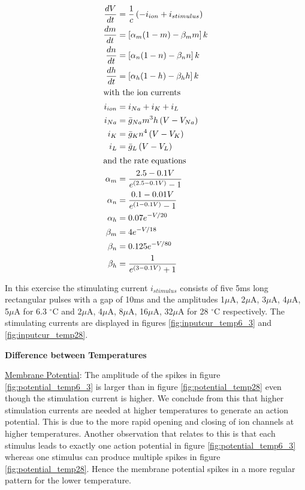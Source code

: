 \documentclass{scrartcl}
\begin{document}
\begin{align}
\frac{d V}{d t}&=\frac{1}{c}\left(-i_{i o n}+i_{s t i m u l u s}\right) \label{eq:membrane} \\
\frac{d m}{d t}&=\left[\alpha_{m}(1-m)-\beta_{m} m\right] k \label{eq:m}\\
\frac{d n}{d t}&=\left[\alpha_{n}(1-n)-\beta_{n} n\right] k \label{eq:n}\\
\frac{d h}{d t}&=\left[\alpha_{h}(1-h)-\beta_{h} h\right] k \label{eq:h}\\
\intertext{with the ion currents}
i_{i o n}&=i_{N a}+i_{K}+i_{L} \\
i_{N a}&=\bar{g}_{N a} m^{3} h\left(V-V_{N a}\right) \label{eq:sodium}\\
i_{K}&=\bar{g}_{K} n^{4}\left(V-V_{K}\right) \label{eq:potassium}\\
\label{eq:il}i_{L}&=\bar{g}_{L}\left(V-V_{L}\right) \\
\intertext{and the rate equations}
\alpha_{m} &=\frac{2.5-0.1 V}{e^{(2.5-0.1 V)}-1} \\ 
\alpha_{n} &=\frac{0.1-0.01 V}{e^{(1-0.1 V)}-1} \\ 
\alpha_{h} &=0.07 e^{-V / 20} \\
\beta_{m} &=4 e^{-V / 18} \\ 
\beta_{n} &=0.125 e^{-V / 80} \\ 
\beta_{h} &=\frac{1}{e^{(3-0.1 V)}+1}
\end{align}


In this exercise the stimulating current $i_{s t i m u l u s}$ consists of five 5ms long rectangular pulses with a gap of 10ms and the amplitudes 1$\mu$A, 2$\mu$A, 3$\mu$A, 4$\mu$A, 5$\mu$A for 6.3 $^{\circ}$C and 2$\mu$A, 4$\mu$A, 8$\mu$A, 16$\mu$A, 32$\mu$A for 28 $^{\circ}$C respectively. The stimulating currents are displayed in figures \ref{fig:inputcur_temp6_3} and \ref{fig:inputcur_temp28}.
\newpage

\textbf{Difference between Temperatures}

\underline{Membrane Potential}: The amplitude of the spikes in figure \ref{fig:potential_temp6_3} is larger than in figure  \ref{fig:potential_temp28} even though the stimulation current is  higher. We conclude from this that higher stimulation currents are needed at higher temperatures to generate an action potential. This is due to the more rapid opening and closing of ion channels at higher temperatures. Another observation that relates to this is that each stimulus leads to exactly one action potential in figure \ref{fig:potential_temp6_3} whereas one stimulus can produce multiple spikes in figure \ref{fig:potential_temp28}. Hence the membrane potential spikes in a more regular pattern for the lower temperature.
\end{document}
